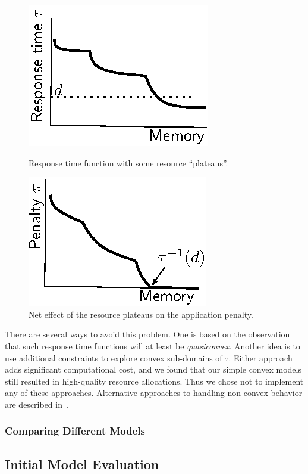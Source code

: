 \begin{figure}[hb]
\parbox{1.6in}{
\includegraphics*{Figures/Plateau1.eps}
\caption{\label{f:plat}Response time function with some resource ``plateaus''.}
}
\hspace{\fill}
\parbox{1.6in}{
\includegraphics*{Figures/Plateau2.eps}
\caption{\label{f:plateffect}Net effect of the resource plateaus on the application penalty.}
}
\end{figure}
There are several ways to avoid this problem.  One is based on the observation that such response time functions will at least be \emph{quasiconvex}.  Another idea is to use additional constraints to explore convex sub-domains of $\tau$. Either approach adds significant computational cost, and we found that our simple convex models still resulted in high-quality resource allocations. Thus we chose not to implement any of these approaches.  Alternative approaches to handling non-convex behavior are described in~\cite{pacora_tr}. 

\subsubsection{Comparing Different Models}

\subsection{Initial Model Evaluation}
\label{init_eval}

